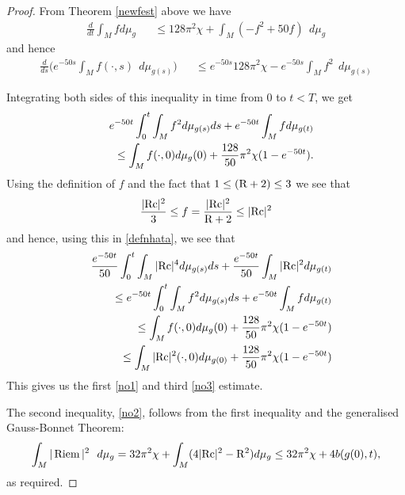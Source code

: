 \documentclass{amsart}
\numberwithin{equation}{section}
\theoremstyle{definition}
\theoremstyle{remark}
\begin{document}
\begin{proof}

From Theorem \eqref{newfest}  above we have
\begin{eqnarray*}
{\frac{d}{d t}} \int_M  f d\mu_g &&\leq 128 \pi^2 \chi + \int_M ( -f^2 +   50 f)
\ \ d\mu_g
\end{eqnarray*}
and hence
\begin{eqnarray}
{\frac{d}{d s}} \Big(e^{-50s} \int_M  f(\cdot,s)  \ \ d\mu_{g(s)}\Big) 
&&\leq e^{-50s}128 \pi^2 \chi  -e^{-50s}\int_M  f^2  \ \ 
d\mu_{g(s)} \label{intest1}
\end{eqnarray}

Integrating both sides of this inequality  in time from $0$ to $t<T$, we get
\begin{eqnarray}
&& e^{-50t} \int_0^t \int_M  f^2 d\mu_{g(s)} ds + e^{-50t}\int_M  f d\mu_{g(t)} \cr
 &&  \ \ \leq   \int_M  f(\cdot,0) d\mu_g(0)   + \frac{128}{50} \pi^2 \chi
 (1- e^{-50t}). 
 \label{defnhata} 
\end{eqnarray}
Using the definition of $f$ and the fact that $1\leq ({{\rm R}} + 2) \leq 3$ we see that
\begin{eqnarray} 
\frac { |{{\rm{Rc}}}|^2 }{3} \leq f = \frac{|{{\rm{Rc}}}|^2}{{{\rm R}} + 2} \leq  |{{\rm{Rc}}}|^2 \label{riccitof}
\end{eqnarray}
and hence,  using this in \eqref{defnhata}, we see that
\begin{eqnarray}
&& \frac{e^{-50t}}{50}  \int_0^t\int_M  |{{\rm{Rc}}}|^4 d\mu_{g(s)} ds  +
\frac{e^{-50t}}{50} \int_M  |{{\rm{Rc}}}|^2 d\mu_{g(t)} \cr 
&& \ \ \ \leq e^{-50t}\int_0^t\int_M  f^2 d\mu_{g(s)} ds +
e^{-50t}\int_M  f d\mu_{g(t)}  \cr
 &&  \ \ \leq  \int_M  f(\cdot,0) d\mu_g(0)   + \frac{128}{50} \pi^2
 \chi (1- e^{-50t})\cr
&&\leq \int_M |{{\rm{Rc}}}|^2(\cdot,0) d\mu_{g(0)} + \frac{128}{50} \pi^2 \chi (1- e^{-50t})
\end{eqnarray}
This gives us the first \eqref{no1} and third \eqref{no3}  estimate.

The second inequality, \eqref{no2}, follows from the first
inequality and  the generalised Gauss-Bonnet Theorem:
\begin{equation}
\int_M |\operatorname{Riem}|^2 \ \ d\mu_g = 32 \pi^2 \chi + \int_M ( 4 |{{\rm{Rc}}}|^2
- {{\rm R}}^2) d\mu_g \leq  32 \pi^2 \chi  + 4 b(g(0),t),
\end{equation}
as required.


\end{proof}
\end{document}
